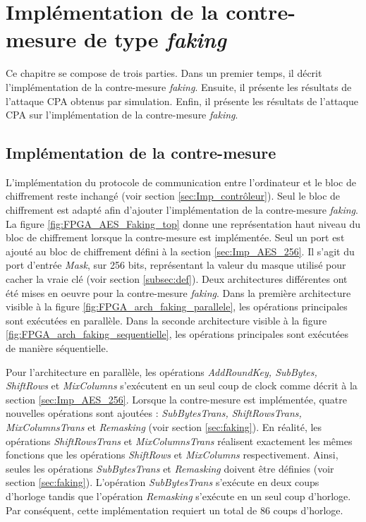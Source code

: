 \documentclass[oneside]{book}
\begin{document}
\newpage


\chapter{Implémentation de la contre-mesure de type \textit{faking}}
\label{chap:faking}

Ce chapitre se compose de trois parties. Dans un premier temps, il décrit l'implémentation de la contre-mesure \textit{faking}. Ensuite, il présente les résultats de l'attaque CPA obtenus par simulation. Enfin, il présente les résultats de l'attaque CPA sur l'implémentation de la contre-mesure \textit{faking}. 

\section{Implémentation de la contre-mesure}
\label{sec:implementation_faking}

L'implémentation du protocole de communication entre l'ordinateur et le bloc de chiffrement reste inchangé (voir section \ref{sec:Imp_contrôleur}). Seul le bloc de chiffrement est adapté afin d'ajouter l'implémentation de la contre-mesure \textit{faking}. La figure \ref{fig:FPGA_AES_Faking_top} donne une représentation haut niveau du bloc de chiffrement lorsque la contre-mesure est implémentée. Seul un port est ajouté au bloc de chiffrement défini à la section \ref{sec:Imp_AES_256}. Il s'agit du port d'entrée \textit{Mask}, sur 256 bits, représentant la valeur du masque utilisé pour cacher la vraie clé (voir section \ref{subsec:def}). Deux architectures différentes ont été mises en oeuvre pour la contre-mesure \textit{faking}. Dans la première architecture visible à la figure \ref{fig:FPGA_arch_faking_parallele}, les opérations principales sont exécutées en parallèle. Dans la seconde architecture visible à la figure \ref{fig:FPGA_arch_faking_sequentielle}, les opérations principales sont exécutées de manière séquentielle.

Pour l'architecture en parallèle, les opérations \textit{AddRoundKey, SubBytes, ShiftRows} et \textit{MixColumns} s'exécutent en un seul coup de clock comme décrit à la section \ref{sec:Imp_AES_256}. Lorsque la contre-mesure est implémentée, quatre nouvelles opérations sont ajoutées : \textit{SubBytesTrans, ShiftRowsTrans, MixColumnsTrans} et \textit{Remasking} (voir section \ref{sec:faking}). En réalité, les opérations \textit{ShiftRowsTrans} et \textit{MixColumnsTrans} réalisent exactement les mêmes fonctions que les opérations \textit{ShiftRows} et \textit{MixColumns} respectivement. Ainsi, seules les opérations \textit{SubBytesTrans} et \textit{Remasking} doivent être définies (voir section \ref{sec:faking}). L'opération \textit{SubBytesTrans} s'exécute en deux coups d'horloge tandis que l'opération \textit{Remasking} s'exécute en un seul coup d'horloge. Par conséquent, cette implémentation requiert un total de 86 coups d'horloge.
\end{document}
